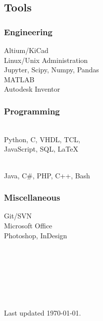 \documentclass[]{resume}
\begin{document}
\begin{facts}
\subsection{Tools}

\subsubsection{Engineering}
Altium/KiCad\\
Linux/Unix Administration\\
Jupyter, Scipy, Numpy, Pandas\\
MATLAB\\
Autodesk Inventor
\sectionsep

\subsubsection{Programming}
\\
Python, C, VHDL, TCL,\\
JavaScript, SQL, LaTeX
\sectionsep

\\
Java, C\#, PHP, C++, Bash
\sectionsep

\subsubsection{Miscellaneous}
Git/SVN\\
Microsoft Office\\
Photoshop, InDesign\\
\\
\\
\\
\\
\\
\\
\\
Last updated \today.

\end{facts}
\end{document}
